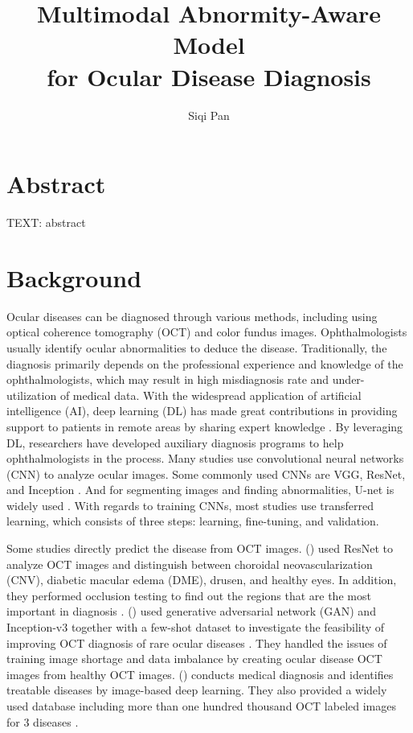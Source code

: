 \documentclass{article}
\newcommand{\authyear}[1]{\citeauthor{#1} (\citeyear{#1})}
\begin{document}
	\title{\vspace{-2.25cm} Multimodal Abnormity-Aware Model\\for Ocular Disease Diagnosis}
	\author{Siqi Pan}
	\date{}
	\maketitle
	
	\section*{Abstract}
	
	TEXT: abstract
	
	\section{Background}
	Ocular diseases can be diagnosed through various methods, including using optical coherence tomography (OCT) and color fundus images. Ophthalmologists usually identify ocular abnormalities to deduce the disease. Traditionally, the diagnosis primarily depends on the professional experience and knowledge of the ophthalmologists, which may result in high misdiagnosis rate and under-utilization of medical data. With the widespread application of artificial intelligence (AI), deep learning (DL) has made great contributions in providing support to patients in remote areas by sharing expert knowledge \autocite{Ichhpujani_Thakur_2021}. By leveraging DL, researchers have developed auxiliary diagnosis programs to help ophthalmologists in the process. Many studies use convolutional neural networks (CNN) to analyze ocular images. Some commonly used CNNs are VGG, ResNet, and Inception \autocite{daich2023artificial}. And for segmenting images and finding abnormalities, U-net is widely used \autocite{Ronneberger_Fischer_Brox_2015}. With regards to training CNNs, most studies use transferred learning, which consists of three steps: learning, fine-tuning, and validation.
	
	Some studies directly predict the disease from OCT images.
	\authyear{li2019deep} used ResNet to analyze OCT images and distinguish between choroidal neovascularization (CNV), diabetic macular edema (DME), drusen, and healthy eyes. In addition, they performed occlusion testing to find out the regions that are the most important in diagnosis \autocite{li2019deep}. 
	\authyear{yoo2021feasibility} used generative adversarial network (GAN) and Inception-v3 together with a few-shot dataset to investigate the feasibility of improving OCT diagnosis of rare ocular diseases \autocite{yoo2021feasibility}. They handled the issues of training image shortage and data imbalance by creating ocular disease OCT images from healthy OCT images. \authyear{Kermany2018} conducts medical diagnosis and identifies treatable diseases by image-based deep learning. They also provided a widely used database including more than one hundred thousand OCT labeled images for 3 diseases \autocite{Kermany2018}.
	
\end{document}
